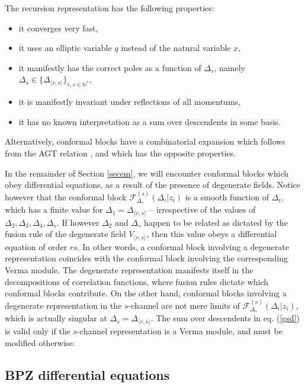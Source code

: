\documentclass[12pt,a4paper,notitlepage]{report}
\newcommand \N {\mathbb{N}}
\numberwithin{equation}{section}
\theoremstyle{break}
\begin{document}
The recursion representation has the following properties:
\begin{itemize}
 \item it converges very fast,
\item it uses an elliptic variable $q$ instead of the natural variable $x$,
\item it manifestly has the correct poles as a function of $\Delta_s$, namely $\Delta_s \in \{\Delta_{\langle r,s\rangle}\}_{r,s\in \N^*}$,
\item it is manifestly invariant under reflections of all momentums,
\item it has no known interpretation as a sum over descendents in some basis.
\end{itemize}
Alternatively, conformal blocks have a combinatorial expansion which follows from the AGT relation \cite{aflt10}, and which has the opposite properties. 

In the remainder of Section \ref{secem}, we will encounter conformal blocks which obey differential equations, as a result of the presence of degenerate fields. 
Notice however that the conformal block $\mathcal{F}^{(s)}_{\Delta_s}(\Delta_i|z_i)$ is a smooth function of $\Delta_i$, which has a finite value for $\Delta_1 = \Delta_{\langle r,s\rangle}$ -- irrespective of the values of $\Delta_2,\Delta_3,\Delta_4,\Delta_s$. 
If however $\Delta_2$ and $\Delta_s$ happen to be related as dictated by the fusion rule of the degenerate field $V_{\langle r,s\rangle}$, then this value obeys a differential equation of order $rs$. In other words, a conformal block involving a degenerate representation coincides with the conformal block involving the corresponding Verma module. The degenerate representation manifests itself in the decompositions of correlation functions, where fusion rules dictate which conformal blocks contribute. On the other hand, conformal blocks involving a degenerate representation in the $s$-channel are not mere limits of $\mathcal{F}^{(s)}_{\Delta_s}(\Delta_i|z_i)$, which is actually singular at $\Delta_s = \Delta_{\langle r,s\rangle}$. The sum over descendents in eq. (\ref{gsd}) is valid only if the $s$-channel representation is a Verma module, and must be modified otherwise. 


\subsection{BPZ differential equations \label{secbpz}}
\end{document}
